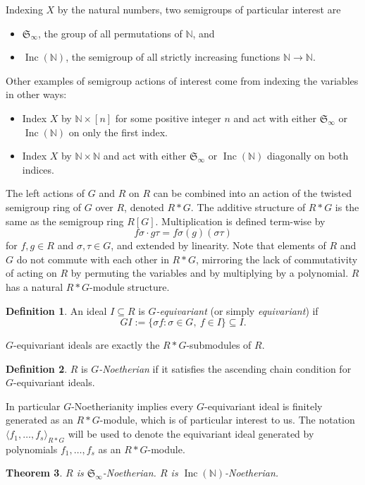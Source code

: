 \documentclass{amsart}
\newtheorem{theorem}{Theorem}[section]
\theoremstyle{definition}
\newtheorem{definition}[theorem]{Definition}
\theoremstyle{remark}
\numberwithin{equation}{section}
\newcommand{\B}[1]{\mathbb #1}
\newcommand{\F}[1]{\mathfrak #1}
\newcommand{\<}{\langle}
\renewcommand{\>}{\rangle}
\newcommand{\ideal}[1]{\langle #1 \rangle}
\newcommand{\Inc}{\operatorname{Inc}(\B N)}
\begin{document}
Indexing $X$ by the natural numbers, two semigroups of particular interest are
\begin{itemize}
 \item ${\mathfrak S}_{\infty}$, the group of all permutations of $\B N$, and
 \item $\Inc$, the semigroup of all strictly increasing functions $\B N \to \B N$.
\end{itemize}
Other examples of semigroup actions of interest come from indexing the variables in other ways:
\begin{itemize}
 \item Index $X$ by $\B N \times [n]$ for some positive integer $n$ and act with either $\F S_\infty$ or $\Inc$ on only the first index.
 \item Index $X$ by $\B N \times \B N$ and act with either $\F S_\infty$ or $\Inc$ diagonally on both indices.
\end{itemize}


The left actions of $G$ and $R$ on $R$ can be combined into an action of the twisted semigroup ring of $G$ over $R$, denoted $R*G$.  The additive structure of $R*G$ is the same as the semigroup ring $R[G]$.  Multiplication is defined term-wise by 
 \[ f\sigma\cdot g\tau = f\sigma(g)(\sigma\tau) \]
for $f,g\in R$ and $\sigma,\tau\in G$, and extended by linearity.  Note that elements of $R$ and $G$ do not commute with each other in $R*G$, mirroring the lack of commutativity of acting on $R$ by permuting the variables and by multiplying by a polynomial.  $R$ has a natural $R*G$-module structure.

\begin{definition}
 An ideal $I \subseteq R$ is $G$\textit{-equivariant}
(or simply \textit{equivariant}) if \[ GI := \{\sigma f
: \sigma \in G, \ f \in I\} \subseteq I.\]
\end{definition}
$G$-equivariant ideals are exactly the $R*G$-submodules of $R$.

\begin{definition}
$R$ is $G${\em -Noetherian} if it satisfies the ascending chain condition for $G$-equivariant ideals. 
\end{definition}
In particular $G$-Noetherianity implies every $G$-equivariant ideal is finitely generated as an $R*G$-module, which is of particular interest to us.  The notation $\ideal{f_1,\ldots,f_s}_{R*G}$ will be used to denote the equivariant ideal generated by polynomials $f_1,\ldots,f_s$ as an $R*G$-module.

\begin{theorem}\label{onevarfinitegenthm}
$R$ is $\F S_\infty$-Noetherian.  $R$ is $\Inc$-Noetherian.
\end{theorem}
\end{document}
